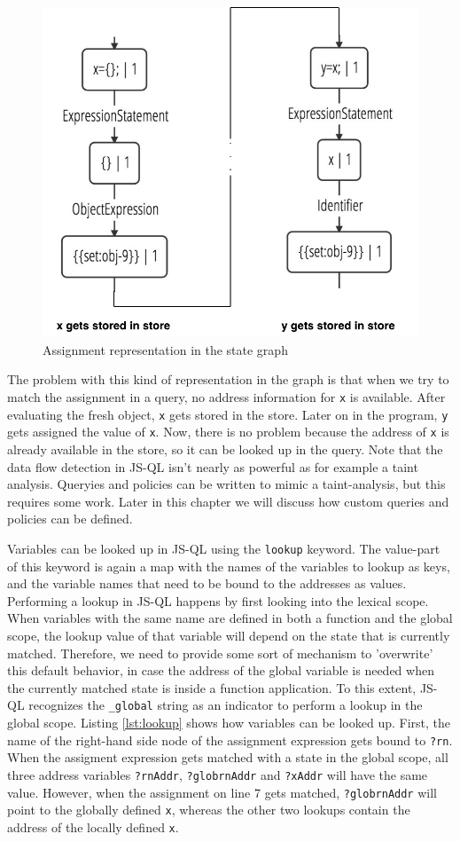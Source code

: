 \begin{figure}[!h]
    \centering
      \includegraphics[width=.5\textwidth]{images/assignmentLookup} 
      \caption{Assignment representation in the state graph}
    \label{fig:AssignmentLookup}
\end{figure}

The problem with this kind of representation in the graph is that when we try to match the assignment in a query, no address information for \texttt{x} is available. After evaluating the fresh object, \texttt{x} gets stored in the store. Later on in the program, \texttt{y} gets assigned the value of \texttt{x}. Now, there is no problem because the address of \texttt{x} is already available in the store, so it can be looked up in the query. Note that the data flow detection in JS-QL isn't nearly as powerful as for example a taint analysis. Queryies and policies can be written to mimic a taint-analysis, but this requires some work. Later in this chapter we will discuss how custom queries and policies can be defined.

Variables can be looked up in JS-QL using the \texttt{lookup} keyword. The value-part of this keyword is again a map with the names of the variables to lookup as keys, and the variable names that need to be bound to the addresses as values. Performing a lookup in JS-QL happens by first looking into the lexical scope. When variables with the same name are defined in both a function and the global scope, the lookup value of that variable will depend on the state that is currently matched. Therefore, we need to provide some sort of mechanism to 'overwrite' this default behavior, in case the address of the global variable is needed when the currently matched state is inside a function application. To this extent, JS-QL recognizes the \texttt{\_global} string as an indicator to perform a lookup in the global scope. Listing \ref{lst:lookup} shows how variables can be looked up. First, the name of the right-hand side node of the assignment expression gets bound to \texttt{?rn}. When the assigment expression gets matched with a state in the global scope, all three address variables \texttt{?rnAddr}, \texttt{?globrnAddr} and \texttt{?xAddr} will have the same value. However, when the assignment on line 7 gets matched, \texttt{?globrnAddr} will point to the globally defined \texttt{x}, whereas the other two lookups contain the address of the locally defined \texttt{x}.

